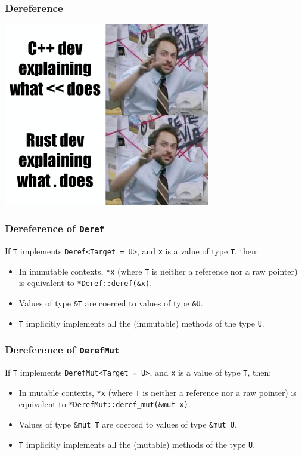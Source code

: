 \documentclass[aspectratio=1610,t]{beamer}
\begin{document}

\begin{frame}[c]
\frametitle{Dereference}
\centering\includegraphics[height=8cm,keepaspectratio]{images/madness.jpg}
\end{frame}


\begin{frame}[fragile]
\frametitle{Dereference of \texttt{Deref}}
If \texttt{T} implements \texttt{Deref<Target = U>}, and \texttt{x} is a value of type \texttt{T}, then:

\begin{itemize}
    \item In immutable contexts, \texttt{*x} (where \texttt{T} is neither a reference nor a raw pointer) is equivalent to \texttt{*Deref::deref(\&x)}.
    \item Values of type \texttt{\&T} are coerced to values of type \texttt{\&U}.
    \item \texttt{T} implicitly implements all the (immutable) methods of the type \texttt{U}.
\end{itemize}
\end{frame}


\begin{frame}[fragile]
\frametitle{Dereference of \texttt{DerefMut}}
If \texttt{T} implements \texttt{DerefMut<Target = U>}, and \texttt{x} is a value of type \texttt{T}, then:

\begin{itemize}
    \item In mutable contexts, \texttt{*x} (where \texttt{T} is neither a reference nor a raw pointer) is equivalent to \texttt{*DerefMut::deref\_mut(\&mut x)}.
    \item Values of type \texttt{\&mut T} are coerced to values of type \texttt{\&mut U}.
    \item \texttt{T} implicitly implements all the (mutable) methods of the type \texttt{U}.
\end{itemize}
\end{frame}
\end{document}
